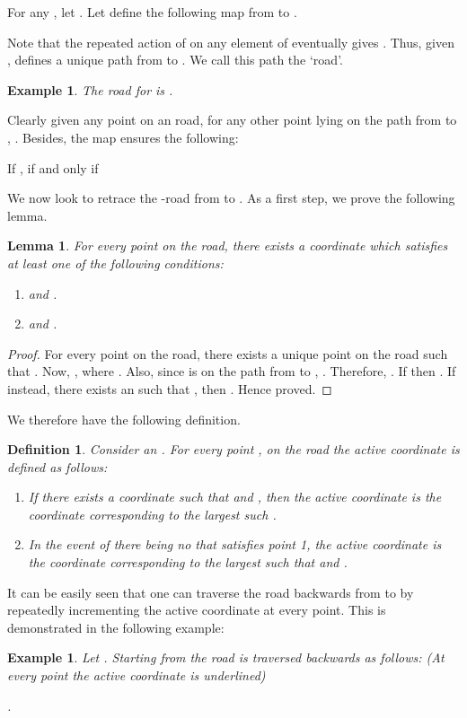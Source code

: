 \documentclass[letterpaper, 12 pt]{article}  \usepackage{amssymb}
\newtheorem{example}[theorem]{Example}
\newtheorem{lemma}[theorem]{Lemma}
\newtheorem{definition}[theorem]{Definition}
\begin{document}
 For any , let . Let  define the following map from  to
. 

Note that the repeated action of  on any element of
 eventually gives . Thus, given
, 
defines a unique path from  to . We call this path the `road'.
\begin{example}
 The road for  
is          .
\end{example}
Clearly given any point  on an road, for any
other point
 lying on the path from  to ,  . Besides, the map  ensures
the following: \begin{itemize}{\item[-] If ,  if and only if }\end{itemize} 


We now look to retrace the -road from  to . As a first step, we
prove the following lemma.

\begin{lemma}
For every point  on the road, there exists
a coordinate  which satisfies
at least one of the following conditions:
\begin{enumerate}
 \item  and .
 \item  and .
\end{enumerate}
\end{lemma}

\begin{proof}
 For every point  on the road, there exists
a unique point  on the road such that .
Now, , where  . Also, since  is on the path from  to
, . Therefore, . If 
 then . If instead, there exists an  such
that , then . Hence proved.
\end{proof}

We therefore have the following definition.
\begin{definition}
Consider an . For every point , 
on the road the active coordinate is defined as follows: 
\begin{enumerate}
\item
If there exists a coordinate  such that  and ,
then the active coordinate is the coordinate corresponding to the largest such
. 
\item
In the event of there being no  that satisfies point 1, the active
coordinate is the
coordinate corresponding to the largest  such that  and
.
\end{enumerate}
\end{definition}


 


It can be easily seen that one can traverse the road backwards from  to 
by repeatedly
incrementing the active coordinate at every point. This is demonstrated in the
following example:
\begin{example}
 Let . Starting from  the road is traversed
backwards as follows: (At every point the active coordinate is underlined) 
  
  
  
 .
\end{example}
 
\end{document}
